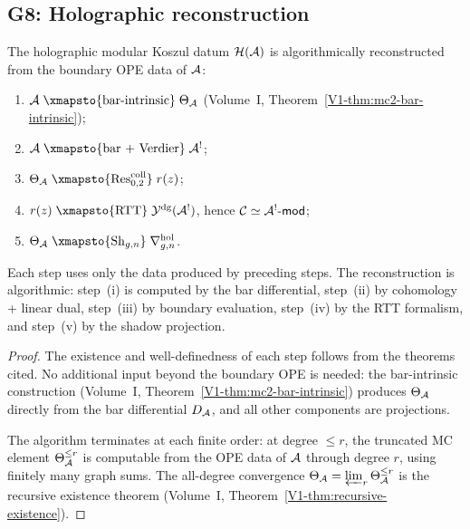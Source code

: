 \subsection{G8: Holographic reconstruction}

\begin{theorem}
The holographic modular Koszul datum $\mathcal{H}(\mathcal{A})$ is algorithmically
reconstructed from the boundary OPE data of $\mathcal{A}$:
\begin{enumerate}[label=\textup{(\roman*)}]
\item $\cA \;\xmapsto{\text{bar-intrinsic}}\; \Theta_\cA$
 (Volume~I, Theorem~\ref*{V1-thm:mc2-bar-intrinsic});
\item $\cA \;\xmapsto{\text{bar + Verdier}}\; \cA^!$;
\item $\Theta_\cA \;\xmapsto{\Res^{\mathrm{coll}}_{0,2}}\; r(z)$;
\item $r(z) \;\xmapsto{\text{RTT}}\; \Ydg(\cA^!)$, hence
 $\mathcal{C} \simeq \mathcal{A}^!\text{-}\mathsf{mod}$;
\item $\Theta_\cA \;\xmapsto{\operatorname{Sh}_{g,n}}\;
 \nabla^{\mathrm{hol}}_{g,n}$.
\end{enumerate}
Each step uses only the data produced by preceding steps.
The reconstruction is algorithmic: step~(i) is computed by the
bar differential, step~(ii) by cohomology + linear dual, step~(iii)
by boundary evaluation, step~(iv) by the RTT formalism, and
step~(v) by the shadow projection.
\end{theorem}

\begin{proof}
The existence and well-definedness of each step follows from the
theorems cited. No additional input beyond
the boundary OPE is needed: the bar-intrinsic construction
(Volume~I, Theorem~\ref*{V1-thm:mc2-bar-intrinsic}) produces $\Theta_{\mathcal{A}}$
directly from the bar differential $D_{\mathcal{A}}$, and all other components
are projections.

The algorithm terminates at each finite order: at degree $\le r$, the
truncated MC element $\Theta_{\mathcal{A}}^{\le r}$ is computable from the OPE
data of $\mathcal{A}$ through degree $r$, using finitely many graph sums.
The all-degree convergence $\Theta_{\mathcal{A}} = \varprojlim_r \Theta_{\mathcal{A}}^{\le r}$
is the recursive existence theorem
(Volume~I, Theorem~\ref{V1-thm:recursive-existence}).
\end{proof}


